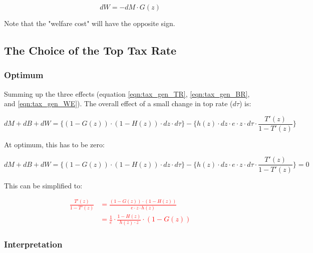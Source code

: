             \begin{equation}
                dW = - dM \cdot G(z)
                \label{eqn:tax_gen_WE}
            \end{equation}

            Note that the "welfare cost" will have the opposite sign.

    \subsection{The Choice of the Top Tax Rate}
    
        \subsubsection{Optimum}

            Summing up the three effects (equation \ref{eqn:tax_gen_TR}, \ref{eqn:tax_gen_BR}, and \ref{eqn:tax_gen_WE}). The overall effect of a small change in top rate ($d\tau$) is:
    
            \begin{equation*}
                dM + dB + dW = \Big\{ (1-G(z)) \cdot (1-H(z)) \cdot dz \cdot d\tau \Big\} - \Big\{ h(z) \cdot dz \cdot e \cdot z \cdot d\tau \cdot \frac{T'(z)}{1-T'(z)} \Big\}
            \end{equation*}
    
            At optimum, this has to be zero:
    
            \begin{equation*}
                dM + dB + dW = \Big\{ (1-G(z)) \cdot (1-H(z)) \cdot dz \cdot d\tau \Big\} - \Big\{ h(z) \cdot dz \cdot e \cdot z \cdot d\tau \cdot \frac{T'(z)}{1-T'(z)} \Big\} = 0
            \end{equation*}
    
            This can be simplified to:
    
            \textcolor{red}{\begin{align}
                \frac{T'(z)}{1-T'(z)} &= \frac{(1-G(z)) \cdot (1-H(z))}{e \cdot z \cdot h(z)} \\
                &= \frac{1}{e} \cdot \frac{1-H(z)}{h(z) \cdot z} \cdot (1-G(z))
            \end{align}}

        \subsubsection{Interpretation}

